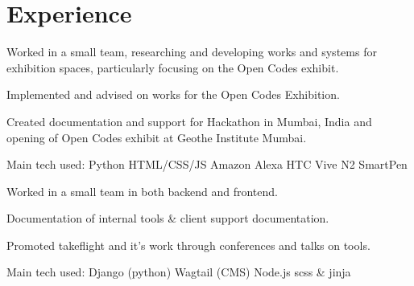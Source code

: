 \documentclass[a4paper]{deedy-resume} %
\begin{document}
\begin{minipage}[t]{0.66\textwidth} %


\section{Experience}


\vspace{\topsep} %
\begin{tightitemize}
\item Worked in a small team, researching and developing works and systems for exhibition spaces, particularly focusing on the Open Codes exhibit.
\item Implemented and advised on works for the Open Codes Exhibition.
\item Created documentation and support for Hackathon in Mumbai, India and opening of Open Codes exhibit at Geothe Institute Mumbai.
\end{tightitemize}
Main tech used: \textbullet{} Python \textbullet{} HTML/CSS/JS \textbullet{} Amazon Alexa \textbullet{} HTC Vive \textbullet{} N2 SmartPen \textbullet{}

\sectionspace %



\vspace{\topsep} %
\begin{tightitemize}
\item Worked in a small team in both backend and frontend.
\item Documentation of internal tools \& client support documentation.
\item Promoted takeflight and it's work through conferences and talks on tools.
\end{tightitemize}
Main tech used: \textbullet{} Django (python) \textbullet{} Wagtail (CMS) \textbullet{} Node.js \textbullet{} scss \& jinja


\end{minipage}
\end{document}
